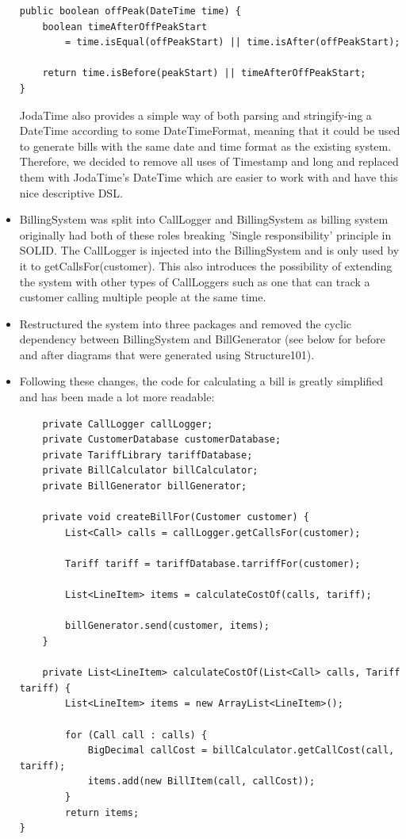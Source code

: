 \documentclass[a4paper,11pt]{article}
\begin{document}
\begin{itemize}
\begin{lstlisting}[caption=The new offPeak(DateTime time) method showing the usage of the DSL provided by JodaTime]
public boolean offPeak(DateTime time) {
    boolean timeAfterOffPeakStart 
        = time.isEqual(offPeakStart) || time.isAfter(offPeakStart);
        
    return time.isBefore(peakStart) || timeAfterOffPeakStart; 
}
\end{lstlisting}

JodaTime also provides a simple way of both parsing and stringify-ing a DateTime according to some DateTimeFormat, meaning that it could be used to generate bills with the same date and time format as the existing system. Therefore, we decided to remove all uses of Timestamp and long and replaced them with JodaTime's DateTime which are easier to work with and have this nice descriptive DSL.
\item BillingSystem was split into CallLogger and BillingSystem as billing system originally had both of these roles breaking 'Single responsibility' principle in SOLID. The CallLogger is injected into the BillingSystem and is only used by it to getCallsFor(customer). This also introduces the possibility of extending the system with other types of CallLoggers such as one that can track a customer calling multiple people at the same time.
\item Restructured the system into three packages and removed the cyclic dependency between BillingSystem and BillGenerator (see below for before and after diagrams that were generated using Structure101).
\item Following these changes, the code for calculating a bill is greatly simplified and has been made a lot more readable:
\begin{lstlisting}
    private CallLogger callLogger;
    private CustomerDatabase customerDatabase;
    private TariffLibrary tariffDatabase;
    private BillCalculator billCalculator;
    private BillGenerator billGenerator;

    private void createBillFor(Customer customer) {
        List<Call> calls = callLogger.getCallsFor(customer);

        Tariff tariff = tariffDatabase.tarriffFor(customer);

        List<LineItem> items = calculateCostOf(calls, tariff);

        billGenerator.send(customer, items);
    }

    private List<LineItem> calculateCostOf(List<Call> calls, Tariff tariff) {
        List<LineItem> items = new ArrayList<LineItem>();

        for (Call call : calls) {
            BigDecimal callCost = billCalculator.getCallCost(call, tariff);
            items.add(new BillItem(call, callCost));
        }
        return items;
}
\end{lstlisting}
\pagebreak

\end{itemize}
\end{document}
